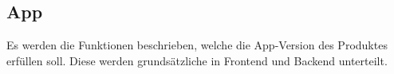 \subsection{App}
Es werden die Funktionen beschrieben, welche die App-Version des Produktes erfüllen soll. Diese werden grundsätzliche in Frontend und Backend unterteilt.

